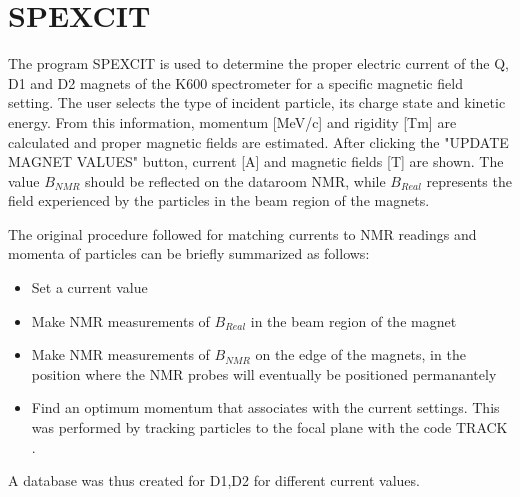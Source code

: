 \documentclass[11pt]{report}
\begin{document}
{}
\bigskip




\section{SPEXCIT}

The program SPEXCIT is used to determine the proper electric current of the Q, D1 and D2
magnets of the K600 spectrometer for a specific magnetic field setting.
The user selects the type of incident particle, its charge state and kinetic energy.
From this information, momentum [MeV/c] and rigidity [Tm] are
calculated and proper magnetic fields are estimated.
After clicking the "UPDATE MAGNET VALUES" button, current [A] and
magnetic fields [T] are shown.  The value $B_{NMR}$ should be reflected on 
the dataroom NMR, while $B_{Real}$ represents the field experienced by the particles
in the beam region of the magnets.

The original procedure followed for matching currents to NMR readings and momenta of particles
can be briefly summarized as follows:
\begin{itemize}
\item Set a current value 
\item Make NMR measurements of $B_{Real}$ in the beam region of the magnet
\item Make NMR measurements of $B_{NMR}$ on the edge of the magnets, in the position where  
      the NMR probes will eventually be positioned permanantely 
\item Find an optimum momentum that associates with the current settings. This was performed
      by tracking particles to the focal plane with the code TRACK \cite{Tra02}.
\end{itemize}
A database was thus created for D1,D2 for different current values.
\end{document}
